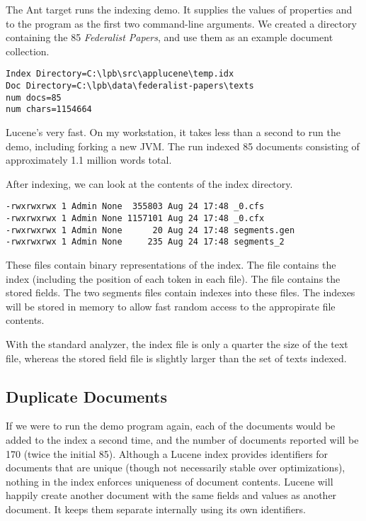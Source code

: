 The Ant target  runs the indexing demo.  It
supplies the values of properties  and 
to the program as the first two command-line arguments.  We created a
directory containing the 85 {\it Federalist Papers}, and use them
as an example document collection.
%
\begin{verbatim}
Index Directory=C:\lpb\src\applucene\temp.idx
Doc Directory=C:\lpb\data\federalist-papers\texts
num docs=85
num chars=1154664
\end{verbatim}
%
Lucene's very fast.  On my workstation, it takes less than a second to
run the demo, including forking a new JVM.  The run indexed 85
documents consisting of approximately 1.1 million words total.

After indexing, we can look at the contents of the index directory.
%
\begin{verbatim}
-rwxrwxrwx 1 Admin None  355803 Aug 24 17:48 _0.cfs
-rwxrwxrwx 1 Admin None 1157101 Aug 24 17:48 _0.cfx
-rwxrwxrwx 1 Admin None      20 Aug 24 17:48 segments.gen
-rwxrwxrwx 1 Admin None     235 Aug 24 17:48 segments_2
\end{verbatim}
%
These files contain binary representations of the index.  The
 file contains the index (including the position of each
token in each file).  The  file contains the stored fields. 
The two segments files contain indexes into these files.  The indexes
will be stored in memory to allow fast random access to the appropirate
file contents.

With the standard analyzer, the index file is only a quarter the size of
the text file, whereas the stored field file is slightly larger than the
set of texts indexed.

\subsection{Duplicate Documents}

If we were to run the demo program again, each of the documents would
be added to the index a second time, and the number of documents
reported will be 170 (twice the initial 85).  Although a Lucene index
provides identifiers for documents that are unique (though not
necessarily stable over optimizations), nothing in the index enforces
uniqueness of document contents.  Lucene will happily create another
document with the same fields and values as another document.  It
keeps them separate internally using its own identifiers.


